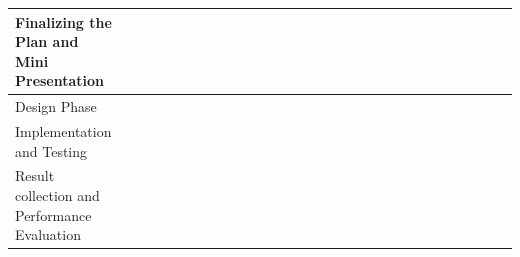 \documentclass[titlepage]{report}
\begin{document}
\begin{table}[ht]
\begin{adjustbox}{width=1.3\textwidth}
\begin{tabular}{|l|l|l|l|l|l|l|l|l|l|l|l|l|l|l|l|l|l|l|l|l|l|l|l|l|l|l|l|l|}
Finalizing the Plan and Mini Presentation    &  &  &                          &                          & \cellcolor[HTML]{32CB00} & \cellcolor[HTML]{32CB00} &                          &                          &                          &                          &                          &                          &                          &                          &                          &                          &                          &                          &                          &                          &                          &                          &                          &                          &                          &                          &  &  \\ \hline
Design Phase                                 &  &  &                          &                          &                          & \cellcolor[HTML]{32CB00} & \cellcolor[HTML]{32CB00} &                          &                          &                          &                          &                          &                          &                          &                          &                          &                          &                          &                          &                          &                          &                          &                          &                          &                          &                          &  &  \\ \hline
Implementation and Testing                   &  &  &                          &                          &                          & \cellcolor[HTML]{32CB00}                         & \cellcolor[HTML]{32CB00} & \cellcolor[HTML]{32CB00} & \cellcolor[HTML]{32CB00} & \cellcolor[HTML]{32CB00} & \cellcolor[HTML]{32CB00} & \cellcolor[HTML]{32CB00} & \cellcolor[HTML]{32CB00} & \cellcolor[HTML]{32CB00} & \cellcolor[HTML]{32CB00} & \cellcolor[HTML]{32CB00} & \cellcolor[HTML]{32CB00} &                          &                          &                          &                          &                          &                          &                          &                          &                          &  &  \\ \hline
Result collection and Performance Evaluation &  &  &                          &                          &                          &                          &                          &                          &                          &                          &                          &                          &                          &                          &                          &                          & \cellcolor[HTML]{32CB00} & \cellcolor[HTML]{32CB00} & \cellcolor[HTML]{32CB00} & \cellcolor[HTML]{32CB00} & \cellcolor[HTML]{32CB00} & \cellcolor[HTML]{32CB00} &                          &                          &                          &                          &  &  \\ \hline

\end{tabular}
\end{adjustbox}
\end{table}
\end{document}
